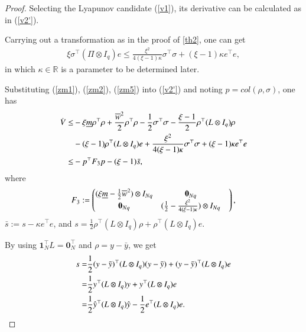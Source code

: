 \documentclass[final,5p,times,twocolumn,authoryear]{elsarticle}
\begin{document}
\begin{proof}
	Selecting the Lyapunov candidate (\ref{v1}), its derivative can be calculated as in (\ref{v2'}).
	
	Carrying out a transformation as in the proof of \autoref{th2}, one can get
	\begin{align}
		\xi\sigma^\top (\Pi\otimes I_q)e \le \frac{\xi^2}{4(\xi-1)\kappa}\sigma^\top \sigma + (\xi-1)\kappa e^\top e,\label{zm5}
	\end{align}
	in which $\kappa\in \mathbb{R}$ is a parameter to be determined later.
	
	
	
	Substituting (\ref{zm1}), (\ref{zm2}), (\ref{zm5}) into (\ref{v2'}) and noting $p=col(\rho,\sigma)$, one has
	\begin{align}
		\dot V \le &-\xi\underline m\rho^\top \rho + \frac{\overline{w}^2}{2}\rho^\top \rho - \frac{1}{2}\sigma^\top \sigma  - \frac{\xi-1}{2}\rho^\top (L\otimes I_q)\rho\notag\\
		&- (\xi-1)\rho^\top (L\otimes I_q)e + \frac{\xi^2}{4(\xi-1)\kappa}\sigma^\top \sigma  + (\xi-1)\kappa e^\top e\notag\\
		\le&-p^\top F_3p-(\xi-1)\bar s,\notag
	\end{align}
	where 
	\begin{align}
		F_3:=
		\begin{pmatrix}
			(\xi\underline m-\frac{1}{2}\overline w^2)\otimes I_{Nq}& \boldsymbol0_{Nq}& \\
			\boldsymbol0_{Nq}& (\frac{1}{2}-\frac{\xi^2}{4(\xi-1)\kappa})\otimes I_{Nq}&\\
		\end{pmatrix},\notag
	\end{align}
	$\bar s := s - \kappa e^\top e$, and $s=\frac{1}{2}\rho^\top (L\otimes I_q)\rho+\rho^\top (L\otimes I_q)e$.
	
	By using $\boldsymbol1_N^\top L=\boldsymbol0_N^\top$ and $\rho=y-\bar y$, we get
	\begin{align}
		s =&\frac{1}{2}(y-\bar y)^\top (L\otimes I_q)(y-\bar y)+(y-\bar y)^\top (L\otimes I_q)e\notag\\
		=&\frac{1}{2}y^\top (L\otimes I_q)y+y^\top (L\otimes I_q)e\notag\\
		=&\frac{1}{2}\hat y^\top (L\otimes I_q)\hat y - \frac{1}{2}e^\top (L\otimes I_q)e. 
	\end{align}
	

\end{proof}
\end{document}
